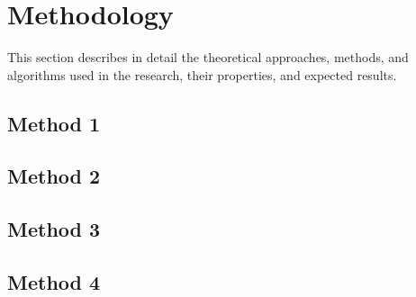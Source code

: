 \chapter{Methodology}
This section describes in detail the theoretical approaches, methods, and algorithms used in the research, their properties, and expected results.

\section{Method 1}

\section{Method 2}

\section{Method 3}

\section{Method 4}